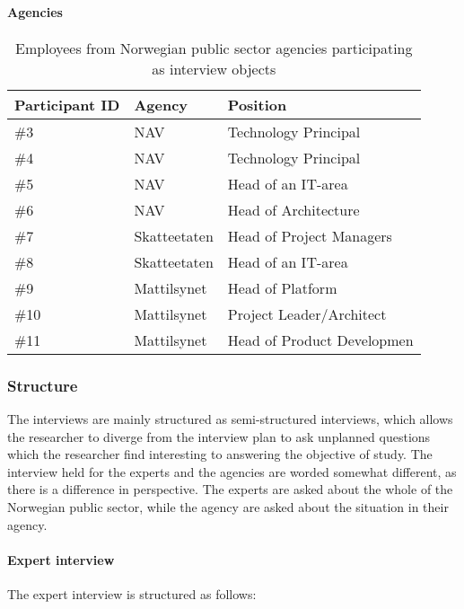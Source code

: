 \paragraph{Agencies} \hspace{0cm}
\begin{table}[H]
\centering
\begin{tabular}{|l|l|l|}
\hline
\textbf{Participant ID} & \textbf{Agency} & \textbf{Position} \\ \hline
\#3 & NAV & Technology Principal \\ \hline
\#4 & NAV & Technology Principal \\ \hline
\#5 & NAV & Head of an IT-area \\ \hline
\#6 & NAV & Head of Architecture \\ \hline
\#7 & Skatteetaten & Head of Project Managers \\ \hline
\#8 & Skatteetaten & Head of an IT-area \\ \hline
\#9 & Mattilsynet & Head of Platform \\ \hline
\#10 & Mattilsynet & Project Leader/Architect \\ \hline
\#11 & Mattilsynet & Head of Product Developmen \\ \hline
\end{tabular}
\caption{Employees from Norwegian public sector agencies participating as interview objects}
\label{tab:agency_participants}
\end{table}


\subsubsection{Structure}
The interviews are mainly structured as semi-structured interviews, which allows the researcher to diverge from the interview plan to ask unplanned questions which the researcher find interesting to answering the objective of study. The interview held for the experts and the agencies are worded somewhat different, as there is a difference in perspective. The experts are asked about the whole of the Norwegian public sector, while the agency are asked about the situation in their agency.

\paragraph{Expert interview}
The expert interview is structured as follows:


